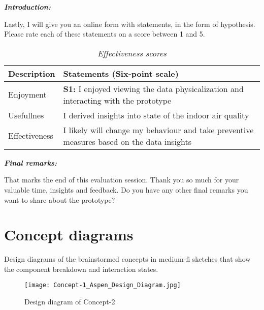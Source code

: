 \begin{appendices}
\vspace{5pt}

\textit{\textbf{Introduction:}}

Lastly, I will give you an online form with statements, in the form of hypothesis. Please rate each of these statements on a score between 1 and 5.\\

\begin{table}[htbp]
    \captionsetup{justification=raggedright,singlelinecheck=false}
    \caption{\textit{Effectiveness scores}}
    \label{tab:column_widths}
    \begin{tabularx}{\textwidth}{|X|X|}
        \hline
        \multicolumn{1}{|p{0.33\textwidth}|}{\textbf{Description}} & \multicolumn{1}{p{0.6\textwidth}|}{\textbf{Statements (Six-point scale)}} \\
        \hline
        Enjoyment & \textbf{S1:} I enjoyed viewing the data physicalization and interacting with the prototype \\
        \hline
        Usefullnes & I derived insights into state of the indoor air quality \\
        \hline
        Effectiveness & I likely will change my behaviour and take preventive measures based on the data insights \\        
    \end{tabularx}
\end{table}

\textit{\textbf{Final remarks:}}

That marks the end of this evaluation session. Thank you so much for your valuable time, insights and feedback. Do you have any other final remarks you want to share about the prototype? \\

\newpage

\section{Concept diagrams}
\label{appendix:conceptdiagrams}

Design diagrams of the brainstormed concepts in medium-fi sketches that show the component breakdown and interaction states.

\begin{figure}[H]
    \centering
    \texttt{[image: Concept-1\_Aspen\_Design\_Diagram.jpg]}
    \caption{Design diagram of Concept-2}
    \label{fig:timeline}
\end{figure}


\end{appendices}
